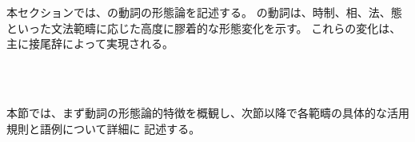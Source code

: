 本セクションでは、\langname の動詞の形態論を記述する。
\langname の動詞は、時制、相、法、態といった文法範疇に応じた高度に膠着的な形態変化を示す。
これらの変化は、主に接尾辞によって実現される。
\begin{exe}
    \ex \gll \\
    \\
    \glt
\end{exe}
本節では、まず動詞の形態論的特徴を概観し、次節以降で各範疇の具体的な活用規則と語例について詳細に
記述する。